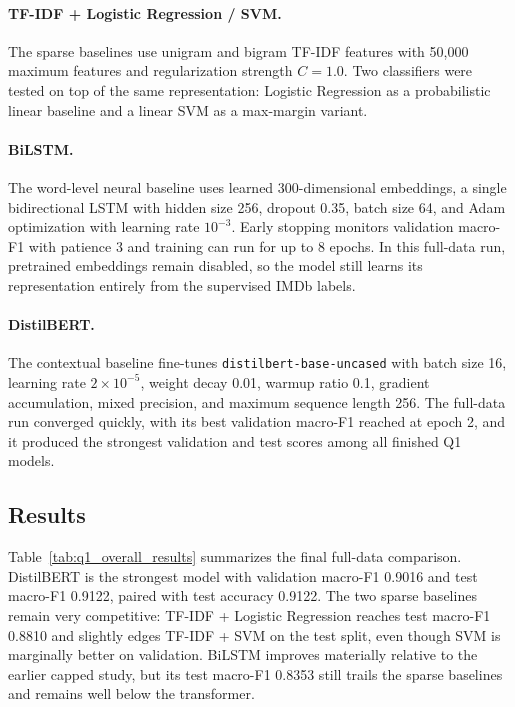 \paragraph{TF-IDF + Logistic Regression / SVM.}
The sparse baselines use unigram and bigram TF-IDF features with 50{,}000 maximum features and regularization strength \(C = 1.0\). Two classifiers were tested on top of the same representation: Logistic Regression as a probabilistic linear baseline and a linear SVM as a max-margin variant.

\paragraph{BiLSTM.}
The word-level neural baseline uses learned 300-dimensional embeddings, a single bidirectional LSTM with hidden size 256, dropout 0.35, batch size 64, and Adam optimization with learning rate \(10^{-3}\). Early stopping monitors validation macro-F1 with patience 3 and training can run for up to 8 epochs. In this full-data run, pretrained embeddings remain disabled, so the model still learns its representation entirely from the supervised IMDb labels.

\paragraph{DistilBERT.}
The contextual baseline fine-tunes \texttt{distilbert-base-uncased} \cite{sanh2019distilbert} with batch size 16, learning rate \(2 \times 10^{-5}\), weight decay 0.01, warmup ratio 0.1, gradient accumulation, mixed precision, and maximum sequence length 256. The full-data run converged quickly, with its best validation macro-F1 reached at epoch 2, and it produced the strongest validation and test scores among all finished Q1 models.

\subsection{Results}

Table~\ref{tab:q1_overall_results} summarizes the final full-data comparison. DistilBERT is the strongest model with validation macro-F1 0.9016 and test macro-F1 0.9122, paired with test accuracy 0.9122. The two sparse baselines remain very competitive: TF-IDF + Logistic Regression reaches test macro-F1 0.8810 and slightly edges TF-IDF + SVM on the test split, even though SVM is marginally better on validation. BiLSTM improves materially relative to the earlier capped study, but its test macro-F1 0.8353 still trails the sparse baselines and remains well below the transformer.


